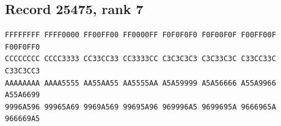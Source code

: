 \documentclass[11pt]{amsart}
\theoremstyle{definition}
\theoremstyle{remark}
\numberwithin{equation}{section}
\numberwithin{table}{section}
\begin{document}
\subsection*{Record 25475, rank 7}
\begin{Verbatim}[fontsize=\scriptsize,xleftmargin=1em]
FFFFFFFF FFFF0000 FF00FF00 FF0000FF F0F0F0F0 F0F00F0F F00FF00F F00F0FF0
CCCCCCCC CCCC3333 CC33CC33 CC3333CC C3C3C3C3 C3C33C3C C33CC33C C33C3CC3
AAAAAAAA AAAA5555 AA55AA55 AA5555AA A5A59999 A5A56666 A55A9966 A55A6699
9996A596 99965A69 9969A569 99695A96 969996A5 9699695A 9666965A 966669A5
\end{Verbatim}
\par
{}\par
\end{document}
